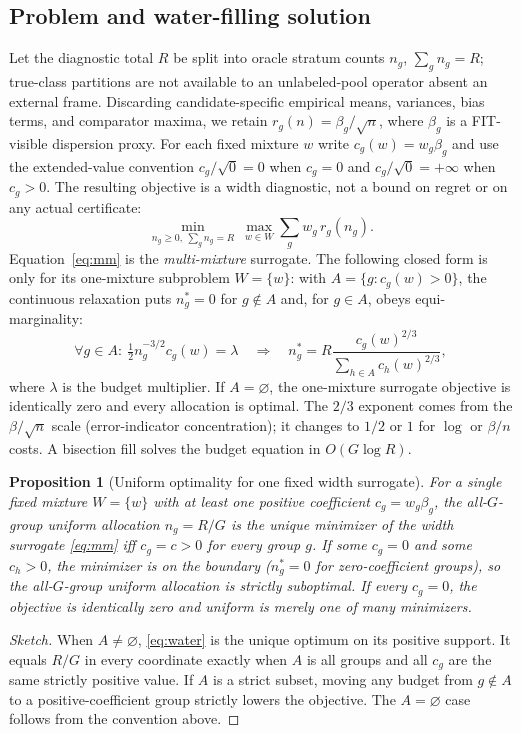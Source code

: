 \documentclass{article}
\newtheorem{proposition}{Proposition}
\begin{document}
\subsection{Problem and water-filling solution}
Let the diagnostic total $R$ be split into oracle stratum counts $n_g$, $\sum_g n_g=R$;
true-class partitions are not available to an unlabeled-pool operator absent an external frame.
Discarding candidate-specific empirical means, variances, bias terms, and comparator maxima,
we retain $r_g(n)=\beta_g/\sqrt n$, where $\beta_g$ is a FIT-visible dispersion proxy. For each
fixed mixture $w$ write $c_g(w)=w_g\beta_g$ and use the extended-value convention
$c_g/\sqrt{0}=0$ when $c_g=0$ and $c_g/\sqrt{0}=+\infty$ when $c_g>0$. The resulting
objective is a width diagnostic, not a bound on regret or on any actual certificate:
\begin{equation*}
  \min_{n_g\ge0,\ \sum_g n_g=R}\ \max_{w\in W}\sum_g w_g\,r_g(n_g).
  \tag{WS}\label{eq:mm}
\end{equation*}
Equation~\eqref{eq:mm} is the \emph{multi-mixture} surrogate. The following closed form is
only for its one-mixture subproblem $W=\{w\}$: with $A=\{g:c_g(w)>0\}$, the continuous
relaxation puts $n_g^*=0$ for $g\notin A$ and, for $g\in A$, obeys equi-marginality:
\begin{equation}
  \forall g\in A:\ \tfrac12 n_g^{-3/2}c_g(w)=\lambda
  \quad\Longrightarrow\quad
  n_g^*=R\frac{c_g(w)^{2/3}}{\sum_{h\in A}c_h(w)^{2/3}},
  \label{eq:water}
\end{equation}
where $\lambda$ is the budget multiplier. If $A=\varnothing$, the one-mixture surrogate
objective is identically zero and every allocation is optimal.
The $2/3$ exponent comes from the $\beta/\sqrt n$ scale (error-indicator concentration); it
changes to $1/2$ or $1$ for $\log$ or $\beta/n$ costs. A bisection fill solves the budget
equation in $O(G\log R)$.

\begin{proposition}[Uniform optimality for one fixed width surrogate]
\label{prop:uniform-opt}
For a \emph{single fixed} mixture $W=\{w\}$ with at least one positive coefficient
$c_g=w_g\beta_g$, the all-$G$-group uniform allocation $n_g=R/G$ is the unique minimizer of
the width surrogate \eqref{eq:mm} iff $c_g=c>0$ for \emph{every} group $g$. If some $c_g=0$
and some $c_h>0$, the minimizer is on the boundary ($n_g^*=0$ for zero-coefficient groups), so
the all-$G$-group uniform allocation is strictly suboptimal. If every $c_g=0$, the objective is
identically zero and uniform is merely one of many minimizers.
\end{proposition}
\begin{proof}[Sketch]
When $A\ne\varnothing$, \eqref{eq:water} is the unique optimum on its positive support.
It equals $R/G$ in every coordinate exactly when $A$ is all groups and all $c_g$ are the same
strictly positive value. If $A$ is a strict subset, moving any budget from $g\notin A$ to a
positive-coefficient group strictly lowers the objective. The $A=\varnothing$ case follows
from the convention above.
\end{proof}
\end{document}
